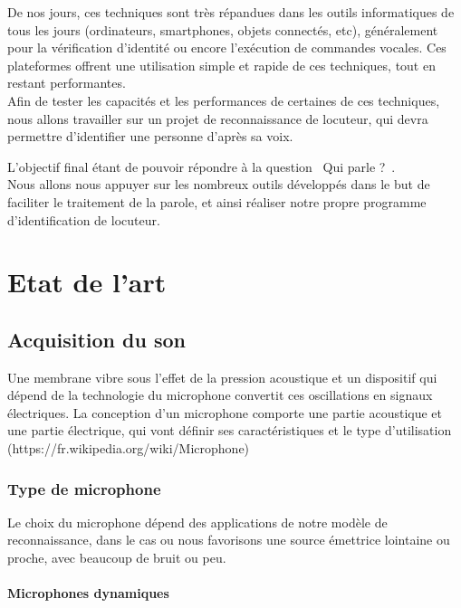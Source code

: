 \documentclass[a4paper, 12pt]{book}
\newcounter{program}[subsection]
\begin{document}
De nos jours, ces techniques sont très répandues dans les outils informatiques de tous les jours (ordinateurs, smartphones, objets connectés, etc), généralement pour la vérification d'identité ou encore l'exécution de commandes vocales. Ces plateformes offrent une utilisation simple et rapide de ces techniques, tout en restant performantes.\\

Afin de tester les capacités et les performances de certaines de ces techniques, nous allons travailler sur un projet de reconnaissance de locuteur, qui devra permettre d'identifier une personne d'après sa voix.

L'objectif final étant de pouvoir répondre à la question \guillemotleft{}~Qui parle ?~\guillemotright{}.\\

Nous allons nous appuyer sur les nombreux outils développés dans le but de faciliter le traitement de la parole, et ainsi réaliser notre propre programme d'identification de locuteur.


\chapter{Etat de l'art}

\section{Acquisition du son}

Une membrane vibre sous l'effet de la pression acoustique et un dispositif qui dépend de la technologie du microphone convertit ces oscillations en signaux électriques. La conception d'un microphone comporte une partie acoustique et une partie électrique, qui vont définir ses caractéristiques et le type d'utilisation (https://fr.wikipedia.org/wiki/Microphone)

\subsection{Type de microphone}

Le choix du microphone dépend des applications de notre modèle de reconnaissance, dans le cas ou nous favorisons une source émettrice lointaine ou proche, avec beaucoup de bruit ou peu. 


\subsubsection{Microphones dynamiques}
\end{document}
